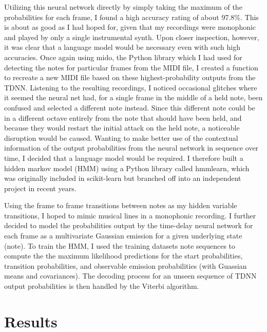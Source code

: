 \documentclass[conference]{IEEEtran}
\begin{document}
Utilizing this neural network directly by simply taking the maximum of the probabilities for each frame, I found a high accuracy rating of about 97.8\%. This is about as good as I had hoped for, given that my recordings were monophonic and played by only a single instrumental synth. Upon closer inspection, however, it was clear that a language model would be necessary even with such high accuracies. Once again using mido, the Python library which I had used for detecting the notes for particular frames from the MIDI file, I created a function to recreate a new MIDI file based on these highest-probability outputs from the TDNN. Listening to the resulting recordings, I noticed occasional glitches where it seemed the neural net had, for a single frame in the middle of a held note, been confused and selected a different note instead. Since this different note could be in a different octave entirely from the note that should have been held, and because they would restart the initial attack on the held note, a noticeable disruption would be caused. Wanting to make better use of the contextual information of the output probabilities from the neural network in sequence over time, I decided that a language model would be required. I therefore built a hidden markov model (HMM) using a Python library called hmmlearn, which was originally included in scikit-learn but branched off into an independent project in recent years. 

Using the frame to frame transitions between notes as my hidden variable transitions, I hoped to mimic musical lines in a monophonic recording. I further decided to model the probabilities output by the time-delay neural network for each frame as a multivariate Gaussian emission for a given underlying state (note). To train the HMM, I used the training datasets note sequences to compute the the maximum likelihood predictions for the start probabilities, transition probabilities, and observable emission probabilities (with Guassian means and covariances). The decoding process for an unseen sequence of TDNN output probabilities is then handled by the Viterbi algorithm.

\section{Results}
\end{document}
